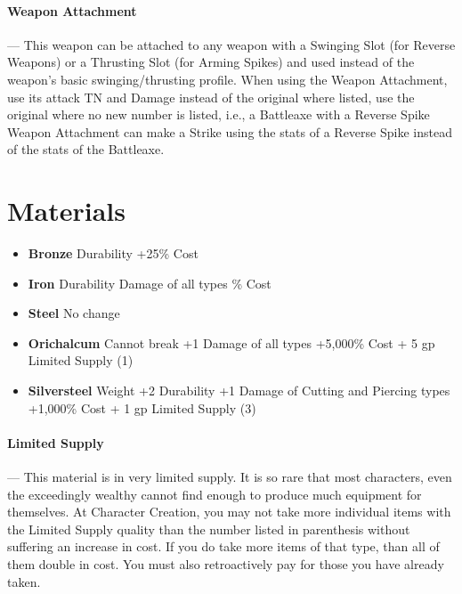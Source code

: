 \documentclass[oneside,11pt,english]{book}
\begin{document}
\vspace{-5pt}\paragraph{\label{wepqual:Weapon Attachment}Weapon Attachment}---\quad
This weapon can be attached to any weapon with a Swinging Slot (for Reverse Weapons) or a Thrusting Slot (for Arming Spikes) and used instead of the weapon’s basic swinging/thrusting profile. When using the Weapon Attachment, use its attack TN and Damage instead of the original where listed, use the original where no new number is listed, i.e., a Battleaxe with a Reverse Spike Weapon Attachment can make a Strike using the stats of a Reverse Spike instead of the stats of the Battleaxe.

\section{Materials}
\begin{itemize}
	\item [] \textbf{Bronze}
	 Durability
	\subitem +25\% Cost
\end{itemize}
\begin{itemize}
\item [] \textbf{Iron}
 Durability
 Damage of all types
\% Cost
\end{itemize}

\begin{itemize}
\item [] \textbf{Steel}
\subitem No change
\end{itemize}
\begin{itemize}
\item [] \textbf{Orichalcum}
\subitem Cannot break
\subitem +1 Damage of all types
\subitem +5,000\% Cost + 5 gp
\subitem Limited Supply (1)
\end{itemize}
\begin{itemize}
\item [] \textbf{Silversteel}
 Weight
\subitem +2 Durability
\subitem +1 Damage of Cutting and Piercing types
\subitem +1,000\% Cost + 1 gp
\subitem Limited Supply (3)
\end{itemize}
\paragraph{Limited Supply}--- \quad
 This material is in very limited supply. It is so rare that most characters, even the exceedingly wealthy cannot find enough to produce much equipment for themselves. At Character Creation, you may not take more individual items with the Limited Supply quality than the number listed in parenthesis without suffering an increase in cost. If you do take more items of that type, than all of them double in cost. You must also retroactively pay for those you have already taken.
\end{document}
